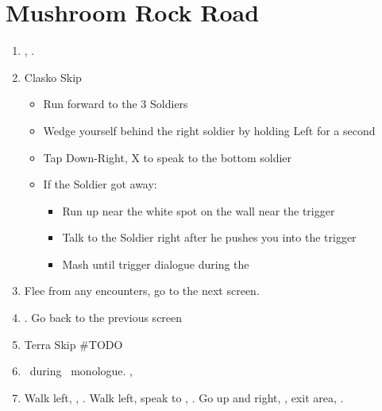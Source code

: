 \chapter{Mushroom Rock Road}

\begin{enumerate}
	\item \sd, \cs.
	\item Clasko Skip
	      \begin{itemize}
		      \item Run forward to the 3 Soldiers
		      \item Wedge yourself behind the right soldier by holding Left for a second
		      \item Tap Down-Right, X to speak to the bottom soldier
		      \item If the Soldier got away:
		            \begin{itemize}
			            \item Run up near the white spot on the wall near the trigger
			            \item Talk to the Soldier right after he pushes you into the trigger
			            \item Mash until trigger dialogue during the \cs
		            \end{itemize}
	      \end{itemize}
	\item Flee from any encounters, go to the next screen.
	\item \save. Go back to the previous screen
	\item Terra Skip #TODO
	\item \sd\ during \tidus\ monologue. \cs[1:00], \sd
	\item Walk left, \save, \sd. Walk left, speak to \auron, \sd. Go up and right, \sd, exit area, \sd.
\end{enumerate}
\bothvfill\winvfill\lossvfill
\ 
\bothcb\wincb\losscb
